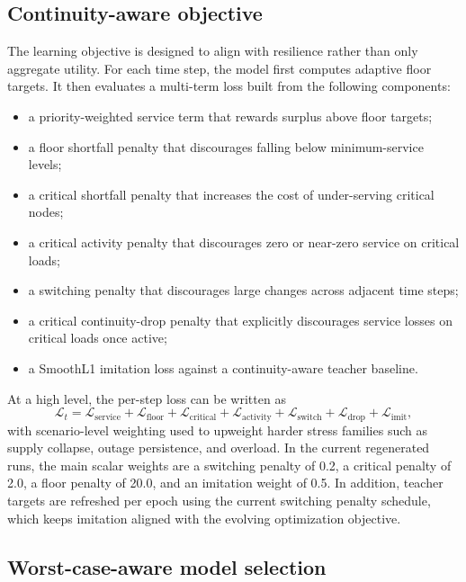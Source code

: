 \documentclass[11pt]{article}
\begin{document}
\subsection{Continuity-aware objective}

The learning objective is designed to align with resilience rather than only aggregate utility. For each time step, the model first computes adaptive floor targets. It then evaluates a multi-term loss built from the following components:

\begin{itemize}[leftmargin=1.5em]
  \item a priority-weighted service term that rewards surplus above floor targets;
  \item a floor shortfall penalty that discourages falling below minimum-service levels;
  \item a critical shortfall penalty that increases the cost of under-serving critical nodes;
  \item a critical activity penalty that discourages zero or near-zero service on critical loads;
  \item a switching penalty that discourages large changes across adjacent time steps;
  \item a critical continuity-drop penalty that explicitly discourages service losses on critical loads once active;
  \item a SmoothL1 imitation loss against a continuity-aware teacher baseline.
\end{itemize}

At a high level, the per-step loss can be written as
\begin{equation}
\mathcal{L}_t = \mathcal{L}_{\mathrm{service}} + \mathcal{L}_{\mathrm{floor}} + \mathcal{L}_{\mathrm{critical}} + \mathcal{L}_{\mathrm{activity}} + \mathcal{L}_{\mathrm{switch}} + \mathcal{L}_{\mathrm{drop}} + \mathcal{L}_{\mathrm{imit}},
\end{equation}
with scenario-level weighting used to upweight harder stress families such as supply collapse, outage persistence, and overload. In the current regenerated runs, the main scalar weights are a switching penalty of 0.2, a critical penalty of 2.0, a floor penalty of 20.0, and an imitation weight of 0.5. In addition, teacher targets are refreshed per epoch using the current switching penalty schedule, which keeps imitation aligned with the evolving optimization objective.

\subsection{Worst-case-aware model selection}
\end{document}
